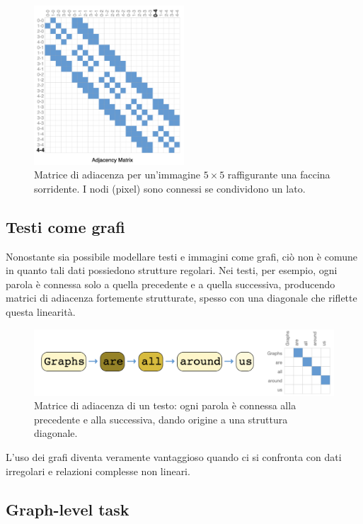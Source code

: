 \begin{figure}
    \centering
    \includegraphics[width=0.5\textwidth]{figure/AdjacencyMatrix}
    \caption{Matrice di adiacenza per un'immagine $5\times5$ raffigurante una faccina sorridente. I nodi (pixel) sono connessi se condividono un lato.}
    \label{fig:adjMatrix}
\end{figure}

\subsection{Testi come grafi}

Nonostante sia possibile modellare testi e immagini come grafi, ciò non è comune in quanto tali dati possiedono strutture regolari. Nei testi, per esempio, ogni parola è connessa solo a quella precedente e a quella successiva, producendo matrici di adiacenza fortemente strutturate, spesso con una diagonale che riflette questa linearità.
\begin{figure}
    \centering
    \includegraphics[width=\textwidth]{figure/TextGraph.png}
    \caption{Matrice di adiacenza di un testo: ogni parola è connessa alla precedente e alla successiva, dando origine a una struttura diagonale.}
    \label{fig:textGraph}
\end{figure}
L’uso dei grafi diventa veramente vantaggioso quando ci si confronta con dati irregolari e relazioni complesse non lineari.

\subsection{Graph-level task}

